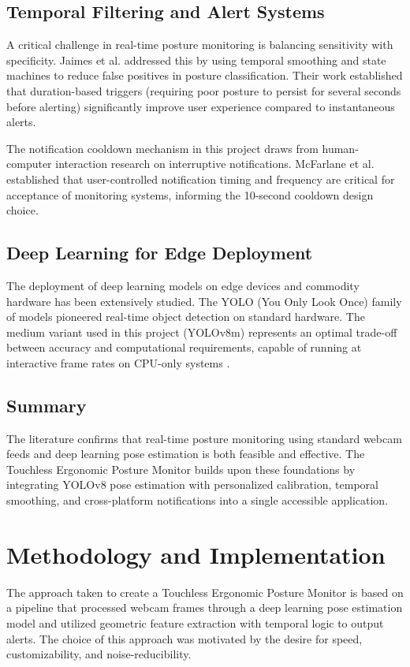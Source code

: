 \documentclass{llncs}
\begin{document}
\subsection{Temporal Filtering and Alert Systems}
A critical challenge in real-time posture monitoring is balancing sensitivity with specificity. Jaimes et al. \cite{jaimes2007approach} addressed this by using temporal smoothing and state machines to reduce false positives in posture classification. Their work established that duration-based triggers (requiring poor posture to persist for several seconds before alerting) significantly improve user experience compared to instantaneous alerts.

The notification cooldown mechanism in this project draws from human-computer interaction research on interruptive notifications. McFarlane et al. \cite{mcfarlane2002scope} established that user-controlled notification timing and frequency are critical for acceptance of monitoring systems, informing the 10-second cooldown design choice.

\subsection{Deep Learning for Edge Deployment}
The deployment of deep learning models on edge devices and commodity hardware has been extensively studied. The YOLO (You Only Look Once) family of models \cite{redmon2016you} pioneered real-time object detection on standard hardware. The medium variant used in this project (YOLOv8m) represents an optimal trade-off between accuracy and computational requirements, capable of running at interactive frame rates on CPU-only systems \cite{ultralytics}.

\subsection{Summary}
The literature confirms that real-time posture monitoring using standard webcam feeds and deep learning pose estimation is both feasible and effective. The Touchless Ergonomic Posture Monitor builds upon these foundations by integrating YOLOv8 pose estimation with personalized calibration, temporal smoothing, and cross-platform notifications into a single accessible application.

\section{Methodology and Implementation}
The approach taken to create a Touchless Ergonomic Posture Monitor is based on a pipeline that processed webcam frames through a deep learning pose estimation model and utilized geometric feature extraction with temporal logic to output alerts. The choice of this approach was motivated by the desire for speed, customizability, and noise-reducibility.
\end{document}
